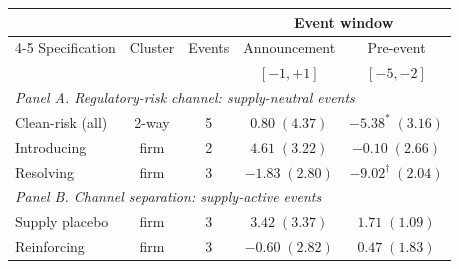 \begin{tabular}{l c c c c}
\toprule
 & & & \multicolumn{2}{c}{Event window} \\
\cmidrule(lr){4-5}
Specification & Cluster & Events & Announcement & Pre-event \\
 & & & $[-1,+1]$ & $[-5,-2]$ \\
\midrule
\multicolumn{5}{l}{\textit{Panel A. Regulatory-risk channel: supply-neutral events}} \\
Clean-risk (all) & 2-way & 5 & $0.80\;(4.37)$ & $-5.38^{*}\;(3.16)$ \\
\quad Introducing & firm & 2 & $4.61\;(3.22)$ & $-0.10\;(2.66)$ \\
\quad Resolving & firm & 3 & $-1.83\;(2.80)$ & $-9.02^{\dagger}\;(2.04)$ \\
\midrule
\multicolumn{5}{l}{\textit{Panel B. Channel separation: supply-active events}} \\
Supply placebo & firm & 3 & $3.42\;(3.37)$ & $1.71\;(1.09)$ \\
Reinforcing & firm & 3 & $-0.60\;(2.82)$ & $0.47\;(1.83)$ \\
\bottomrule
\end{tabular}
